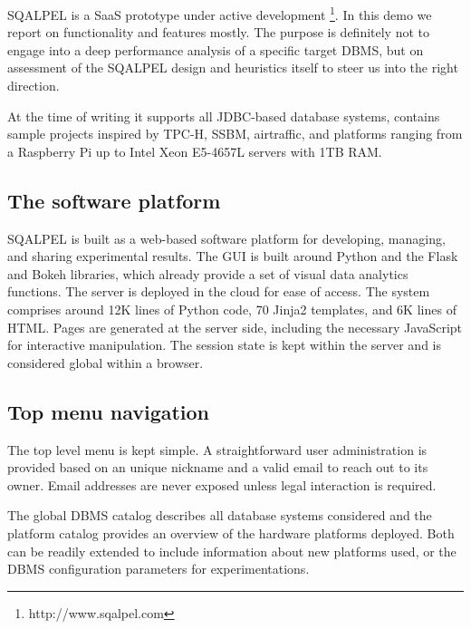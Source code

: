 \documentclass{cidr-2019}
\begin{document}
{\sc SQALPEL} is a SaaS prototype under active development \footnote{http://www.sqalpel.com }.
In this
demo we report on functionality and features mostly. The purpose is definitely
not to engage into a deep performance analysis of a specific target
DBMS, but on assessment of the {\sc SQALPEL} design and heuristics itself to
steer us into the right direction. 

At the time of writing it supports all JDBC-based database systems, contains sample projects inspired by TPC-H, SSBM, airtraffic, and platforms ranging from a Raspberry Pi up to Intel Xeon E5-4657L servers with 1TB RAM.


\subsection{The software platform}\label{GUI}
{\sc SQALPEL} is built as a web-based software platform for developing,
managing, and sharing experimental results. The GUI is built around Python and the
Flask and Bokeh libraries, which already provide a set of visual
data analytics functions. The server is deployed in the cloud for ease of access.
The system comprises around 12K lines of Python code, 
70 Jinja2 templates, and 6K lines of HTML.
Pages are generated at the server side, including the necessary JavaScript
for interactive manipulation.
The session state is kept within the server and is considered global within a browser.

\subsection{Top menu navigation}
The top level menu is kept simple. A straightforward user administration
is provided based on an unique nickname and a valid email to reach out to its owner.
Email addresses are never exposed unless legal interaction is required.


The global DBMS catalog describes all database systems considered
and the platform catalog provides an overview of the hardware platforms deployed.
Both can be readily extended to include information about new platforms used,
or the DBMS configuration parameters for experimentations.
\end{document}
